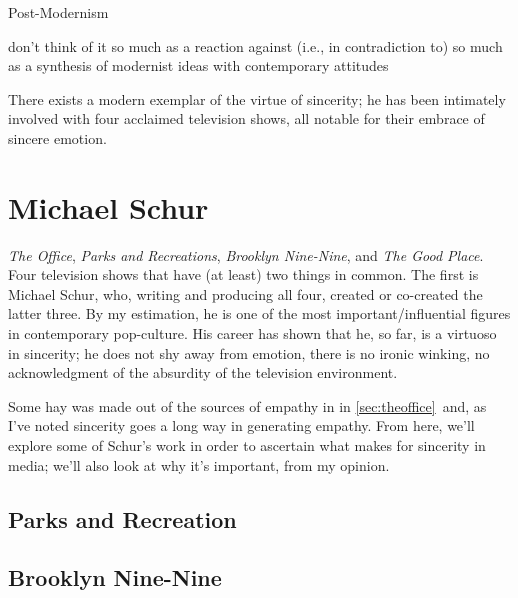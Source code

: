 \documentclass[../butidigress.tex]{subfiles}
\begin{document}
\begin{somenotes}{Post-Modernism}
    \item don't think of it so much as a reaction against (i.e., in contradiction to) so much as a synthesis of modernist ideas with contemporary attitudes
\end{somenotes}

There exists a modern exemplar of the virtue of sincerity; he has been intimately involved with four acclaimed television shows, all notable for their embrace of sincere emotion.

\section{Michael Schur}
\textit{The Office}, \textit{Parks and Recreations}, \textit{Brooklyn Nine-Nine}, and \textit{The Good Place}.
Four television shows that have (at least) two things in common.
The first is Michael Schur, who, writing and producing all four, created or co-created the latter three.
By my estimation, he is one of the most important/influential figures in contemporary pop-culture.
His career has shown that he, so far, is a virtuoso in sincerity; he does not shy away from emotion, there is no ironic winking, no acknowledgment of the absurdity of the television environment.

Some hay was made out of the sources of empathy in  in \ref{sec:theoffice}\ and, as I've noted sincerity goes a long way in generating empathy.
From here, we'll explore some of Schur's work in order to ascertain what makes for sincerity in media; we'll also look at why it's important, from my opinion.

\subsection{Parks and Recreation}

\subsection{Brooklyn Nine-Nine}
\end{document}
